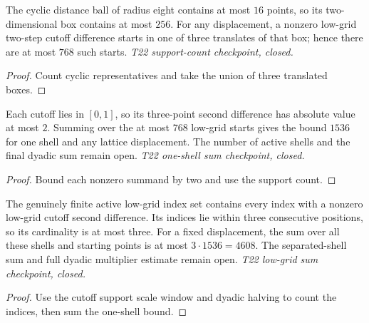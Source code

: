 \begin{lemma}
  \label{lem:normalized-cutoff-low-grid-count}
  \leanok
  The cyclic distance ball of radius eight contains at most $16$ points,
  so its two-dimensional box contains at most $256$. For any displacement,
  a nonzero low-grid two-step cutoff difference starts in one of three
  translates of that box; hence there are at most $768$ such starts.
  \emph{T22 support-count checkpoint, closed.}
\end{lemma}
\begin{proof}\leanok
  Count cyclic representatives and take the union of three translated boxes.
\end{proof}

\begin{lemma}
  \label{lem:normalized-cutoff-low-grid-sum}
  \leanok
  Each cutoff lies in $[0,1]$, so its three-point second difference has
  absolute value at most $2$. Summing over the at most $768$ low-grid
  starts gives the bound $1536$ for one shell and any lattice displacement.
  The number of active shells and the final dyadic sum remain open.
  \emph{T22 one-shell sum checkpoint, closed.}
\end{lemma}
\begin{proof}\leanok
  Bound each nonzero summand by two and use the support count.
\end{proof}

\begin{lemma}
  \label{lem:normalized-cutoff-low-grid-scales}
  \leanok
  The genuinely finite active low-grid index set contains every index
  with a nonzero low-grid cutoff second difference. Its indices lie
  within three consecutive positions, so its cardinality is at most
  three. For a fixed displacement, the sum over all these shells and
  starting points is at most $3\cdot1536=4608$. The separated-shell
  sum and full dyadic multiplier estimate remain open.
  \emph{T22 low-grid sum checkpoint, closed.}
\end{lemma}
\begin{proof}\leanok
  Use the cutoff support scale window and dyadic halving to count the
  indices, then sum the one-shell bound.
\end{proof}

